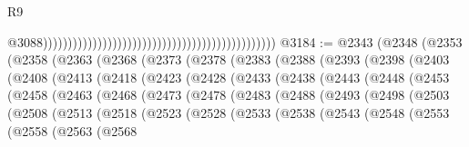 \begin{lexlean}{R9}
\begin{coremodule}
{{{{{{{{{{{{{{{{{{{{{{{{{{{{{{{{{{{{{{{{{{{{{{{{{{{{{{{{{{{{{{{{{{{{{{{{{{{{{{{{{{{{{{{{{{{{{{{{{{{{{{{{{{{{                                                                                                  @3088)))))))))))))))))))))))))))))))))))))))))))))))
@3184 := @2343
    (@2348
      (@2353
        (@2358
          (@2363
            (@2368
              (@2373
                (@2378
                  (@2383
                    (@2388
                      (@2393
                        (@2398
                          (@2403
                            (@2408
                              (@2413
                                (@2418
                                  (@2423
                                    (@2428
                                      (@2433
                                        (@2438
                                          (@2443
                                            (@2448
                                              (@2453
                                                (@2458
                                                  (@2463
                                                    (@2468
                                                      (@2473
                                                        (@2478
                                                          (@2483
                                                            (@2488
                                                              (@2493
                                                                (@2498
                                                                  (@2503
                                                                    (@2508
                                                                      (@2513
                                                                        (@2518
                                                                          (@2523
                                                                            (@2528
                                                                              (@2533
                                                                                (@2538
                                                                                  (@2543
                                                                                    (@2548
                                                                                      (@2553
                                                                                        (@2558
                                                                                          (@2563
                                                                                            (@2568
}}}}}}}}}}}}}}}}}}}}}}}}}}}}}}}}}}}}}}}}}}}}}}}}}}}}}}}}}}}}}}}}}}}}}}}}}}}}}}}}}}}}}}}}}}}}}}}}}}}}}}}}}}}}
\end{coremodule}
\end{lexlean}
